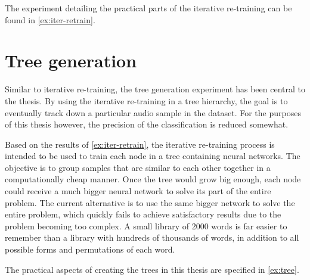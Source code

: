 The experiment detailing the practical parts of the iterative re-training can be found in \cref{ex:iter-retrain}.

\section{Tree generation}
Similar to iterative re-training, the tree generation experiment has been central to the thesis.
By using the iterative re-training in a tree hierarchy, the goal is to eventually track down a particular audio sample in the dataset.
For the purposes of this thesis however, the precision of the classification is reduced somewhat.

Based on the results of \cref{ex:iter-retrain}, the iterative re-training process is intended to be used to train each node in a tree containing neural networks.
The objective is to group samples that are similar to each other together in a computationally cheap manner.
Once the tree would grow big enough, each node could receive a much bigger neural network to solve its part of the entire problem.
The current alternative is to use the same bigger network to solve the entire problem, which quickly fails to achieve satisfactory results due to the problem becoming too complex.
A small library of 2000 words is far easier to remember than a library with hundreds of thousands of words, in addition to all possible forms and permutations of each word.


The practical aspects of creating the trees in this thesis are specified in \cref{ex:tree}.



